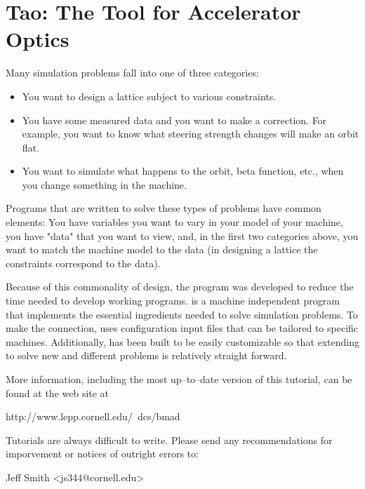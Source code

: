 \documentclass{report}
\begin{document}
{
\setlength{\parskip}{\dPar}
\setlength{\parindent}{0ex}

\section*{Tao: The Tool for Accelerator Optics}

Many simulation problems fall into one of three categories: 

\begin{itemize}
\item 
You want to design a lattice subject to various constraints.
\item 
You have some measured data and you want to make a correction. For
example, you want to know what steering strength changes will make an orbit
flat.
\item
You want to simulate what happens to the orbit, beta function,
etc., when you change something in the machine.
\end{itemize}

Programs that are written to solve these types of problems have common
elements: You have variables you want to vary in your model of your
machine, you have "data" that you want to view, and, in the first two
categories above, you want to match the machine model to the data (in
designing a lattice the constraints correspond to the data).

Because of this commonality of design, the \tao program was developed
to reduce the time needed to develop working programs. \tao is a
machine independent program that implements the essential ingredients
needed to solve simulation problems. To make the
connection, \tao uses configuration input files that can be tailored to
specific machines. Additionally, \tao has been built
to be easily customizable so that extending \tao to solve new and
different problems is relatively straight forward.

More information, including the most up--to--date version of this
tutorial, can be found at the \bmad web site at
\begin{example}
  http://www.lepp.cornell.edu/~dcs/bmad
\end{example}

Tutorials are always difficult to write. Please send any recommendations 
for imporvement or notices of outright errors to:
\begin{example}
  Jeff Smith <js344@cornell.edu>
\end{example}
}

\tableofcontents
\end{document}
